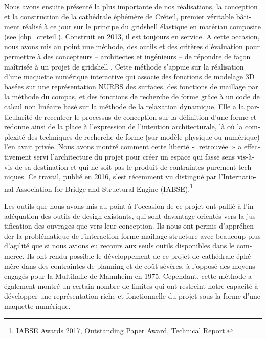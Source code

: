 \begin{otherlanguage}{french}
Nous avons ensuite présenté la plus importante de nos réalisations, la conception et la construction de la cathédrale éphémère de Créteil, premier véritable bâtiment réalisé à ce jour sur le principe du gridshell élastique en matériau composite (see \cref{chp=creteil}). Construit en 2013, il est toujours en service. A cette occasion, nous avons mis au point une méthode, des outils et des critères d’évaluation pour permettre à des concepteurs -- architectes et ingénieurs -- de répondre de façon maîtrisée à un projet de gridshell \cite{DuPeloux2016}. Cette méthode s'appuie sur la réalisation d'une maquette numérique interactive qui associe des fonctions de modelage 3D basées sur une représentation NURBS des surfaces, des fonctions de maillage par la méthode du compas, et des fonctions de recherche de forme grâce à un code de calcul non linéaire basé sur la méthode de la relaxation dynamique. Elle a la particularité de recentrer le processus de conception sur la définition d’une forme et redonne ainsi de la place à l’expression de l’intention architecturale, là où la complexité des techniques de recherche de forme (sur modèle physique ou numérique) l’en avait privée. Nous avons montré comment cette liberté « retrouvée » a effectivement servi l’architecture du projet pour créer un espace qui fasse sens vis-à-vis de sa destination et qui ne soit pas le produit de contraintes purement techniques. Ce travail, publié en 2016, s’est récemment vu distingué par l’International Association for Bridge and Structural Engine (IABSE).\footnote{IABSE Awards 2017, Outstanding Paper Award, Technical Report.}

Les outils que nous avons mis au point à l'occasion de ce projet ont pallié à l’inadéquation des outils de design existants, qui sont davantage orientés vers la justification des ouvrages que vers leur conception. Ils nous ont permis d’appréhender la problématique de l’interaction forme-maillage-structure avec beaucoup plus d’agilité que si nous avions eu recours aux seuls outils disponibles dans le commerce. Ils ont rendu possible le développement de ce projet de cathédrale éphémère dans des contraintes de planning et de coût sévères, à l’opposé des moyens engagés pour la Multihalle de Mannheim en 1975. Cependant, cette méthode a également montré un certain nombre de limites qui ont restreint notre capacité à développer une représentation riche et fonctionnelle du projet sous la forme d'une maquette numérique.


\end{otherlanguage}
